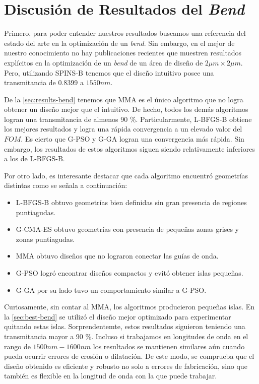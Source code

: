 \section{Discusión de Resultados del \emph{Bend}}

Primero, para poder entender nuestros resultados buscamos una referencia del estado del arte
en la optimización de un \emph{bend}.
Sin embargo, en el mejor de nuestro conocimiento no hay publicaciones recientes que muestren
resultados explícitos en la optimización de un \emph{bend} de un área de diseño de $2 \mu m \times 2 \mu m$.
Pero, utilizando SPINS-B tenemos que el diseño intuitivo posee una transmitancia de $0.8399$ a $1550 nm$.


De la \autoref{sec:results-bend} tenemos que MMA es el único algoritmo que no logra obtener un diseño
mejor que el intuitivo. 
De hecho, todos los demás algoritmos logran una transmitancia de almenos 90 \%.
Particularmente, L-BFGS-B obtiene los mejores resultados y logra una rápida convergencia a un
elevado valor del $FOM$.
Es cierto que G-PSO y G-GA logran una convergencia más rápida. Sin embargo, los 
resultados de estos algoritmos siguen siendo relativamente inferiores a los de L-BFGS-B.

Por otro lado, es interesante destacar que cada algoritmo encuentró geometrías distintas como se
señala a continuación:

\begin{itemize}
  \item L-BFGS-B obtuvo geometrías bien definidas sin gran presencia de regiones puntiagudas.

  \item G-CMA-ES obtuvo geometrías con presencia de pequeñas zonas grises y zonas puntiagudas.

  \item MMA obtuvo diseños que no lograron conectar las guías de onda.

  \item G-PSO logró encontrar diseños compactos y evitó obtener islas pequeñas.

  \item G-GA por su lado tuvo un comportamiento similar a G-PSO.

\end{itemize}

Curiosamente, sin contar al MMA, los algoritmos producieron pequeñas islas.
En la \autoref{sec:best-bend} se utilizó el diseño mejor optimizado para experimentar
quitando estas islas. Sorprendentemte, estos resultados siguieron teniendo una transmitancia
mayor a 90 \%.
Incluso si trabajamos en longitudes de onda en el rango de $1500nm-1600nm$
los resultados se mantienen similares aún cuando pueda ocurrir errores de erosión o dilatación.
De este modo, se comprueba que el diseño obtenido es eficiente y robusto no solo a errores
de fabricación, sino que también es flexible en la longitud de onda con la que puede trabajar.

